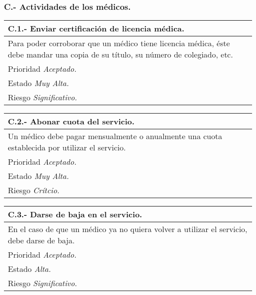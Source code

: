 \documentclass[a4paper,oneside,11pt]{book}
\begin{document}
\subsubsection{C.- Actividades de los médicos.}

\begin{center}
\begin{tabulary}{15cm}{|L|}
	\hline
		\bf{C.1.- Enviar certificación de licencia médica.} \\
	\hline
		Para poder corroborar que un médico tiene licencia médica, éste debe mandar una copia de su título, su número de colegiado, etc. \\
	\hline
		Prioridad \textit{Aceptado.} \\
	\hline
		Estado \textit{Muy Alta.} \\
	\hline
		Riesgo \textit{Significativo.} \\
	\hline
\end{tabulary}
\end{center}

\begin{center}
\begin{tabulary}{15cm}{|L|}
	\hline
		\bf{C.2.- Abonar cuota del servicio.} \\
	\hline
		Un médico debe pagar mensualmente o anualmente una cuota establecida por utilizar el servicio. \\
	\hline
		Prioridad \textit{Aceptado.} \\
	\hline
		Estado \textit{Muy Alta.} \\
	\hline
		Riesgo \textit{Crítcio.} \\
	\hline
\end{tabulary}
\end{center}

\begin{center}
\begin{tabulary}{15cm}{|L|}
	\hline
		\bf{C.3.- Darse de baja en el servicio.} \\
	\hline
		En el caso de que un médico ya no quiera volver a utilizar el servicio, debe darse de baja. \\
	\hline
		Prioridad \textit{Aceptado.} \\
	\hline
		Estado \textit{Alta.} \\
	\hline
		Riesgo \textit{Significativo.} \\
	\hline
\end{tabulary}
\end{center}
\end{document}
